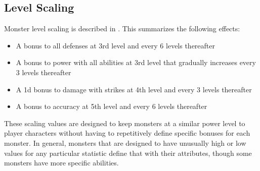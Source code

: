     \subsection{Level Scaling}
        Monster level scaling is described in .
        This summarizes the following effects:
        \begin{itemize}
            \item A  bonus to all defenses at 3rd level and every 6 levels thereafter
            \item A  bonus to power with all abilities at 3rd level that gradually increases every 3 levels thereafter
            \item A \plus1d bonus to damage with strikes at 4th level and every 3 levels thereafter
            \item A  bonus to accuracy at 5th level and every 6 levels thereafter
        \end{itemize}
        These scaling values are designed to keep monsters at a similar power level to player characters without having to repetitively define specific bonuses for each monster.
        In general, monsters that are designed to have unusually high or low values for any particular statistic define that with their attributes, though some monsters have more specific abilities.

